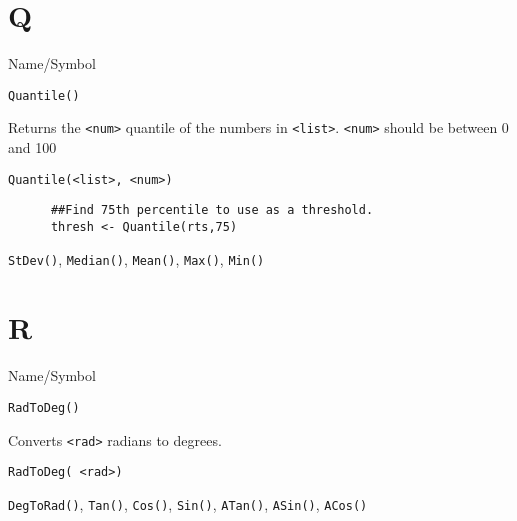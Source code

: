 \rl

\section{Q}
\rl

\begin{desc}{Name/Symbol}
\item[Name/Symbol]	\verb+Quantile()+

\item[Description]	Returns the \verb+<num>+ quantile of
		the numbers in \verb+<list>+. \verb+<num>+ should be  between
        0 and 100

\item[Usage]		
\begin{verbatim}
Quantile(<list>, <num>)
\end{verbatim}

\item[Example]	
 \begin{verbatim}
      ##Find 75th percentile to use as a threshold.
      thresh <- Quantile(rts,75) 
 \end{verbatim}
\item[See Also]	\verb+StDev()+, \verb+Median()+, \verb+Mean()+, \verb+Max()+, \verb+Min()+
\end{desc}

\rl


\section{R}
\rl


\begin{desc}{Name/Symbol}
\item[Name/Symbol] 	\verb+RadToDeg()+ 

\item[Description] 	Converts \verb+<rad>+ radians to degrees.

\item[Usage]		
\begin{verbatim}
RadToDeg( <rad>)			 
\end{verbatim}

\item[Example]	

\item[See Also]     	\verb+DegToRad()+, \verb+Tan()+, \verb+Cos()+, \verb+Sin()+, \verb+ATan()+, \verb+ASin()+, \verb+ACos()+
\end{desc}

\rl



